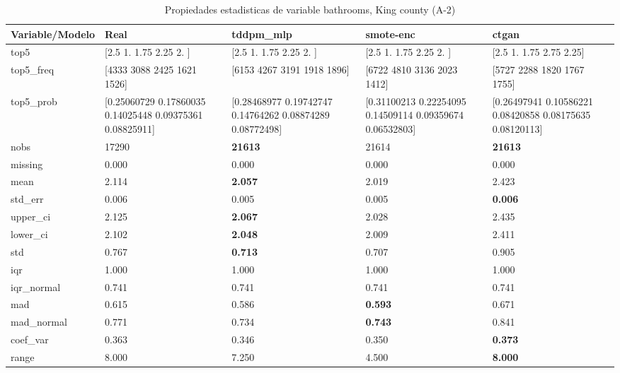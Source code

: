 \begin{table}[H]
\centering
\fontsize{8}{14}\selectfont
\caption{Propiedades  estadisticas de variable bathrooms, King county (A-2)}
\label{table-stats-king county-a-2-bathrooms}
\begin{tabular}{|l|m{10em}|m{10em}|m{10em}|m{10em}|}
\hline
 \rowcolor[gray]{0.8}
Variable/Modelo & Real & tddpm\_mlp & smote-enc & ctgan \\
\hline top5 & [2.5  1.   1.75 2.25 2.  ] & [2.5  1.   1.75 2.25 2.  ] & [2.5  1.   1.75 2.25 2.  ] & [2.5  1.   1.75 2.75 2.25] \\
\hline top5\_freq & [4333 3088 2425 1621 1526] & [6153 4267 3191 1918 1896] & [6722 4810 3136 2023 1412] & [5727 2288 1820 1767 1755] \\
\hline top5\_prob & [0.25060729 0.17860035 0.14025448 0.09375361 0.08825911] & [0.28468977 0.19742747 0.14764262 0.08874289 0.08772498] & [0.31100213 0.22254095 0.14509114 0.09359674 0.06532803] & [0.26497941 0.10586221 0.08420858 0.08175635 0.08120113] \\
\hline nobs & 17290 & \bfseries 21613 & \cellcolor[rgb]{0.9, 0.54, 0.52} 21614 & \bfseries 21613 \\
\hline missing & 0.000 & 0.000 & 0.000 & 0.000 \\
\hline mean & 2.114 & \bfseries 2.057 & 2.019 & \cellcolor[rgb]{0.9, 0.54, 0.52} 2.423 \\
\hline std\_err & 0.006 & 0.005 & \cellcolor[rgb]{0.9, 0.54, 0.52} 0.005 & \bfseries 0.006 \\
\hline upper\_ci & 2.125 & \bfseries 2.067 & 2.028 & \cellcolor[rgb]{0.9, 0.54, 0.52} 2.435 \\
\hline lower\_ci & 2.102 & \bfseries 2.048 & 2.009 & \cellcolor[rgb]{0.9, 0.54, 0.52} 2.411 \\
\hline std & 0.767 & \bfseries 0.713 & 0.707 & \cellcolor[rgb]{0.9, 0.54, 0.52} 0.905 \\
\hline iqr & 1.000 & 1.000 & 1.000 & 1.000 \\
\hline iqr\_normal & 0.741 & 0.741 & 0.741 & 0.741 \\
\hline mad & 0.615 & 0.586 & \bfseries 0.593 & \cellcolor[rgb]{0.9, 0.54, 0.52} 0.671 \\
\hline mad\_normal & 0.771 & 0.734 & \bfseries 0.743 & \cellcolor[rgb]{0.9, 0.54, 0.52} 0.841 \\
\hline coef\_var & 0.363 & \cellcolor[rgb]{0.9, 0.54, 0.52} 0.346 & 0.350 & \bfseries 0.373 \\
\hline range & 8.000 & 7.250 & \cellcolor[rgb]{0.9, 0.54, 0.52} 4.500 & \bfseries 8.000 \\

\end{tabular}
\end{table}
